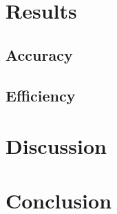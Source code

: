 \documentclass{article}
\begin{document}
\begin{multicols}{2}
\section{Results}
\subsection{Accuracy}

\subsection{Efficiency}


\section{Discussion}


\section{Conclusion}



\end{multicols}
\end{document}
